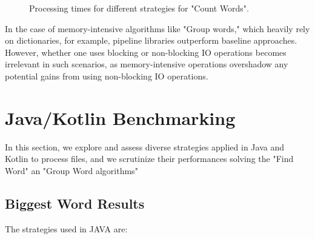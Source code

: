 \begin{figure}[H]
    \raggedright
    \caption{Processing times for different strategies for "Count Words".}
    \label{fig:group_word_processing_times_cs}
\end{figure}

In the case of memory-intensive algorithms like "Group words," which heavily rely on dictionaries, for example, pipeline libraries outperform baseline approaches. However, whether one uses blocking or non-blocking IO operations becomes irrelevant in such scenarios, as memory-intensive operations overshadow any potential gains from using non-blocking IO operations.

\clearpage

\section{Java/Kotlin Benchmarking}
\label{sec:java_implementation}

In this section, we explore and assess diverse strategies applied in Java and Kotlin to process files, and we scrutinize their performances solving the "Find Word" an "Group Word algorithms"


\subsection{Biggest Word Results}
\label{subsubsec:biggest_word_results}

The strategies used in JAVA are:

